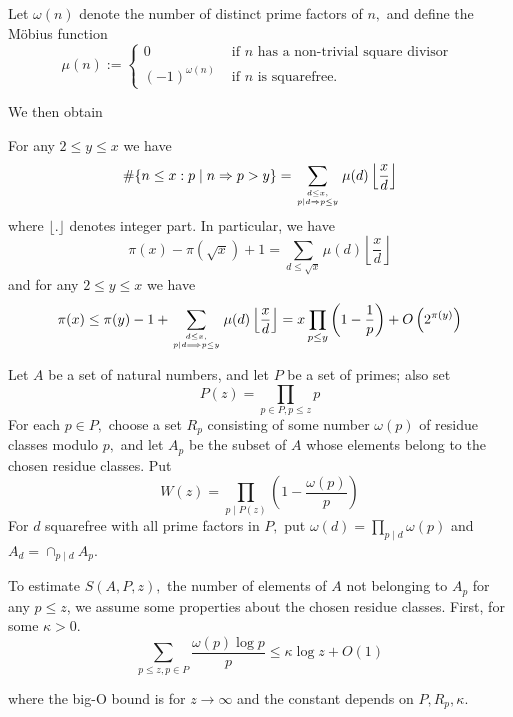 \begin{definition}
Let $\omega(n)$ denote the number of distinct prime factors of $n,$ and define the Möbius function
$$
\mu(n):=\left\{\begin{array}{ll}
0 & \text { if } n \text { has a non-trivial square divisor } \\
(-1)^{\omega(n)} & \text { if } n \text { is squarefree. }
\end{array}\right.
$$
\end{definition}


We then obtain

\begin{theorem} For any $2 \leq y \leq x$ we have
$$
\#\{n \leq x: p \mid n \Rightarrow p>y\}=\sum_{d \leq x, \atop p \mid d \Rightarrow p \leq y} \mu(d)\left\lfloor\frac{x}{d}\right\rfloor
$$
where $\lfloor.\rfloor$ denotes integer part.
In particular, we have
$$
\pi(x)-\pi(\sqrt{x})+1=\sum_{d \leq \sqrt{x}} \mu(d)\left\lfloor\frac{x}{d}\right\rfloor
$$
and for any $2 \leq y \leq x$ we have
$$
\pi(x) \leq \pi(y)-1+\sum_{d \leq x, \atop p \mid d \Longrightarrow p \leq y} \mu(d)\left\lfloor\frac{x}{d}\right\rfloor=x \prod_{p \leq y}\left(1-\frac{1}{p}\right)+O\left(2^{\pi(y)}\right)
$$
\end{theorem}

Let $A$ be a set of natural numbers, and let $P$ be a set of primes; also set
$$
P(z)=\prod_{p \in P, p \leq z} p
$$
For each $p \in P,$ choose a set $R_{p}$ consisting of some number $\omega(p)$ of residue classes modulo $p,$ and let $A_{p}$ be the subset of $A$ whose elements belong to the chosen residue classes. Put
$$
W(z)=\prod_{p \mid P(z)}\left(1-\frac{\omega(p)}{p}\right)
$$
For $d$ squarefree with all prime factors in $P,$ put $\omega(d)=\prod_{p \mid d} \omega(p)$ and $A_{d}=\cap_{p \mid d} A_{p}$.

To estimate $S(A, P, z),$ the number of elements of $A$ not belonging to $A_{p}$ for any $p \leq z$, we assume some properties about the chosen residue classes. First, for some $\kappa>0$.
\begin{equation}
\sum_{p \leq z, p \in P} \frac{\omega(p) \log p}{p} \leq \kappa \log z+O(1)    
\end{equation}

where the big-O bound is for $z \rightarrow \infty$ and the constant depends on $P, R_{p}, \kappa$.

